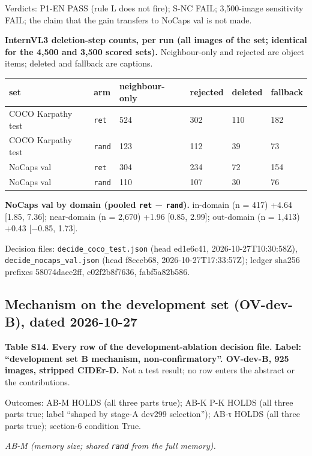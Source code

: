 Verdicts: P1-EN PASS (rule L does not fire); S-NC FAIL; 3,500-image sensitivity FAIL; the claim that
the gain transfers to NoCaps val is not made.

\textbf{InternVL3 deletion-step counts, per run (all images of the set; identical for the 4,500 and
3,500 scored sets).} Neighbour-only and rejected are object items; deleted and fallback are
captions.

\begin{longtable}[]{@{}llllll@{}}
\toprule\noalign{}
set & arm & neighbour-only & rejected & deleted & fallback \\
\midrule\noalign{}
\endhead
\bottomrule\noalign{}
\endlastfoot
COCO Karpathy test & \texttt{ret} & 524 & 302 & 110 & 182 \\
COCO Karpathy test & \texttt{rand} & 123 & 112 & 39 & 73 \\
NoCaps val & \texttt{ret} & 304 & 234 & 72 & 154 \\
NoCaps val & \texttt{rand} & 110 & 107 & 30 & 76 \\
\end{longtable}

\textbf{NoCaps val by domain (pooled \texttt{ret} − \texttt{rand}).} in-domain (n = 417) +4.64
{[}1.85, 7.36{]}; near-domain (n = 2,670) +1.96 {[}0.85, 2.99{]}; out-domain (n = 1,413) +0.43
{[}−0.85, 1.73{]}.

Decision files: \texttt{decide\_\allowbreak{}coco\_\allowbreak{}test.json} (head ed1e6c41, 2026-10-27T10:30:58Z),
\texttt{decide\_\allowbreak{}nocaps\_\allowbreak{}val.json} (head f8cccb68, 2026-10-27T17:33:57Z); ledger sha256 prefixes
58074daee2ff, c02f2b8f7636, fabf5a82b586.

\subsection{Mechanism on the development set (OV-dev-B), dated
2026-10-27}\label{mechanism-on-the-development-set-ov-dev-b-dated-2026-10-27}

\textbf{Table S14. Every row of the development-ablation decision file. Label: ``development set B
mechanism, non-confirmatory''. OV-dev-B, 925 images, stripped CIDEr-D.} Not a test result; no row
enters the abstract or the contributions.

Outcomes: AB-M HOLDS (all three parts true); AB-K P-K HOLDS (all three parts true; label ``shaped by
stage-A dev299 selection''); AB-τ HOLDS (all three parts true); section-6 condition True.

\emph{AB-M (memory size; shared \texttt{rand} from the full memory).}

